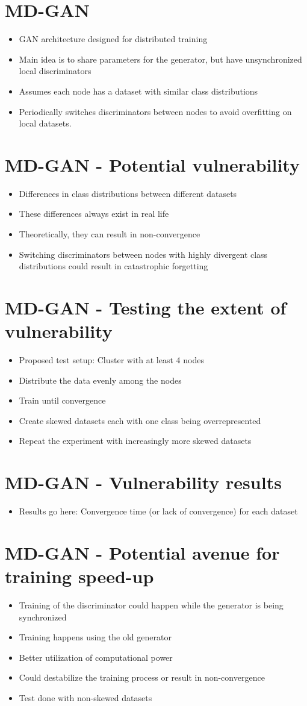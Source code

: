 \documentclass[11pt]{article}       %
\newenvironment{slide}[1]        {\section{#1} \begin{itemize}}%
                                 {\end{itemize}}
\begin{document}
\begin{slide}{MD-GAN}
\item GAN architecture designed for distributed training
\item Main idea is to share parameters for the generator, but have unsynchronized local discriminators
\item Assumes each node has a dataset with similar class distributions
\item Periodically switches discriminators between nodes to avoid overfitting on local datasets.
\end{slide}

\begin{slide}{MD-GAN - Potential vulnerability}
\item Differences in class distributions between different datasets
\item These differences always exist in real life
\item Theoretically, they can result in non-convergence
\item Switching discriminators between nodes with highly divergent class distributions could result in catastrophic forgetting
\end{slide}

\begin{slide}{MD-GAN - Testing the extent of vulnerability}
\item Proposed test setup: Cluster with at least 4 nodes
\item Distribute the data evenly among the nodes
\item Train until convergence
\item Create skewed datasets each with one class being overrepresented
\item Repeat the experiment with increasingly more skewed datasets
\end{slide}

\begin{slide}{MD-GAN - Vulnerability results}
\item Results go here: Convergence time (or lack of convergence) for each dataset
\end{slide}

\begin{slide}{MD-GAN - Potential avenue for training speed-up}
\item Training of the discriminator could happen while the generator is being synchronized
\item Training happens using the old generator
\item Better utilization of computational power
\item Could destabilize the training process or result in non-convergence
\item Test done with non-skewed datasets
\end{slide}
\end{document}
